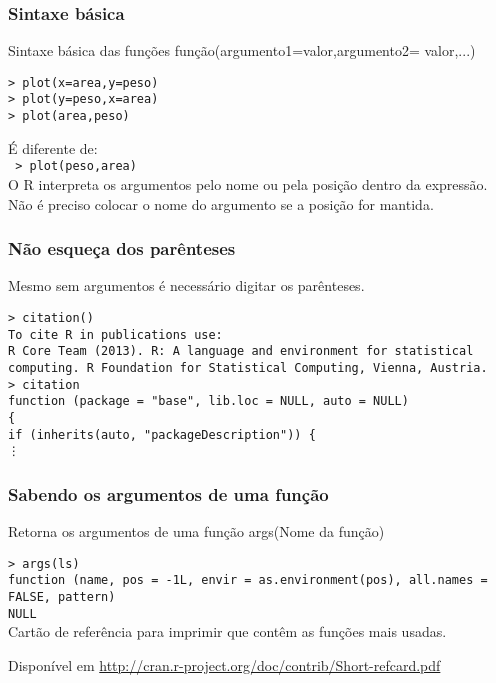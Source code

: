 \documentclass{beamer}
\begin{document}
 \begin{frame}
 \frametitle{Sintaxe básica}
 \begin{block}{Sintaxe básica das funções}
  função(argumento1=valor,argumento2= valor,...)
 \end{block}
 \texttt{> plot(x=area,y=peso)\\
        > plot(y=peso,x=area)\\
        > plot(area,peso)}

         \vspace{10pt} 
\pause
         É diferente de: \\
       \texttt{ > plot(peso,area)} \\
\pause
\vspace{10pt}
O R interpreta os argumentos pelo nome ou pela posição dentro da expressão. Não é preciso colocar o nome do argumento se a posição for mantida. 
 \end{frame}
 \begin{frame}
   \frametitle{Não esqueça dos parênteses}
   Mesmo sem argumentos é necessário digitar os parênteses. 
   \vspace{10pt}

\texttt{\small  > citation()\\
     \vspace{10pt}
    To cite R in publications use:\\ 
    \vspace{10pt}
  R Core Team (2013). R: A language and environment for statistical 
  computing. R Foundation for Statistical Computing, Vienna, Austria. \\
\pause
\vspace{10pt}
 > citation \\
 function (package =  "base", lib.loc = NULL, auto = NULL) \\
\{ \\
    if (inherits(auto, "packageDescription")) \{ \\
    \vdots   
  } 
 \end{frame}
 \begin{frame}
   \frametitle{Sabendo os argumentos de uma função}
   \begin{block}{Retorna os argumentos de uma função}
      args(Nome da função) \\
       \end{block}
\pause
\texttt{> args(ls) \\
function (name, pos = -1L, envir = as.environment(pos), all.names = FALSE, 
    pattern) \\
NULL\\}
\pause
\vspace{10pt}
   Cartão de referência para imprimir que contêm as funções mais usadas.

 Disponível em \url{http://cran.r-project.org/doc/contrib/Short-refcard.pdf}  

\end{frame}
\end{document}
